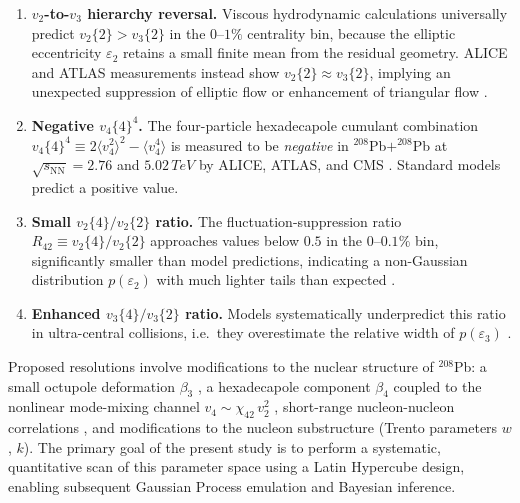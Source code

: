 \documentclass[12pt,a4paper,twoside]{report}
\newcommand{\ep}[1]{\varepsilon_{#1}}
\newcommand{\vn}[2]{v_{#1}\{#2\}}
\newcommand{\mean}[1]{\langle #1 \rangle}
\newcommand{\PbPb}{$^{208}$Pb$+^{208}$Pb\xspace}
\newcommand{\sqrtsnn}{\sqrt{s_\mathrm{NN}}}
\begin{document}
\begin{tcolorbox}[puzzlebox={The Ultracentral Flow Puzzle — Experimental Signatures}]
\begin{enumerate}[label=(\roman*), leftmargin=*]
  \item \textbf{$v_2$-to-$v_3$ hierarchy reversal.}
        Viscous hydrodynamic calculations universally predict
        $\vn{2}{2} > \vn{3}{2}$ in the $0$--$1\%$ centrality bin, because
        the elliptic eccentricity $\ep{2}$ retains a small finite mean from
        the residual geometry.  ALICE and ATLAS measurements instead show
        $\vn{2}{2} \approx \vn{3}{2}$, implying an unexpected suppression of
        elliptic flow or enhancement of triangular flow
        \cite{Aamodt2011,Aad2012,Luzum2013}.
  \item \textbf{Negative $v_4\{4\}^4$.}
        The four-particle hexadecapole cumulant combination
        $v_4\{4\}^4 \equiv 2\mean{v_4^2}^2 - \mean{v_4^4}$ is measured
        to be \emph{negative} in \PbPb at $\sqrtsnn = 2.76$ and
        $5.02\,\si{TeV}$ by ALICE, ATLAS, and CMS
        \cite{Adam2016,Aaboud2019,Sirunyan2017}.
        Standard models predict a positive value.
  \item \textbf{Small $v_2\{4\}/v_2\{2\}$ ratio.}
        The fluctuation-suppression ratio
        $R_{42} \equiv v_2\{4\}/v_2\{2\}$
        approaches values below $0.5$ in the $0$--$0.1\%$ bin,
        significantly smaller than model predictions, indicating
        a non-Gaussian distribution $p(\varepsilon_2)$ with much lighter
        tails than expected \cite{Giacalone2017}.
  \item \textbf{Enhanced $v_3\{4\}/v_3\{2\}$ ratio.}
        Models systematically underpredict this ratio in ultra-central
        collisions, i.e.\ they overestimate the relative width of
        $p(\varepsilon_3)$ \cite{Chatrchyan2014}.
\end{enumerate}
\end{tcolorbox}

\noindent
Proposed resolutions involve modifications to the nuclear structure of
$^{208}$Pb: a small octupole deformation $\beta_3$
\cite{Carzon2020}, a hexadecapole component $\beta_4$ coupled to the
nonlinear mode-mixing channel $v_4 \sim \chi_{42}\,v_2^2$
\cite{Giacalone2017b}, short-range nucleon-nucleon correlations
\cite{Luzum2023}, and modifications to the nucleon substructure
(Trento parameters $w$, $k$).  The primary goal of the present study
is to perform a systematic, quantitative scan of this parameter space
using a Latin Hypercube design, enabling subsequent Gaussian Process
emulation and Bayesian inference.
\end{document}
